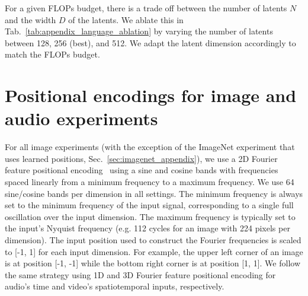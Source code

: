\documentclass{article} %
\newcommand{\ourmodel}{Perceiver IO\xspace}
\begin{document}
For a given FLOPs budget, there is a trade off between the number of latents $N$ and the width $D$ of the latents. We ablate this in Tab.~\ref{tab:appendix_language_ablation} by varying the number of latents between 128, 256 (best), and 512. We adapt the latent dimension accordingly to match the FLOPs budget.

\begin{table}[h]
\centering
{}
\vspace{1mm}
\caption{\small \label{tab:appendix_language_ablation} Ablation on the UTF-8 Bytes \ourmodel{} latent width versus depth.}
\end{table}


\section{Positional encodings for image and audio experiments}
\label{sec:fourier_pos_enc}

For all image experiments (with the exception of the ImageNet experiment that uses learned positions, Sec.~\ref{sec:imagenet_appendix}), we use a 2D Fourier feature positional encoding~\citep{vaswani2017attention, stanley2007compositional, mildenhall2020nerf, tancik2020fourier} using a sine and cosine bands with frequencies spaced linearly from a minimum frequency to a maximum frequency. We use 64 sine/cosine bands per dimension in all settings. The minimum frequency is always set to the minimum frequency of the input signal, corresponding to a single full oscillation over the input dimension. The maximum frequency is typically set to the input's Nyquist frequency (e.g. 112 cycles for an image with 224 pixels per dimension). The input position used to construct the Fourier frequencies is scaled to [-1, 1] for each input dimension. For example, the upper left corner of an image is at position [-1, -1] while the bottom right corner is at position [1, 1]. We follow the same strategy using 1D and 3D Fourier feature positional encoding for audio's time and video's spatiotemporal inputs, respectively.
\end{document}
